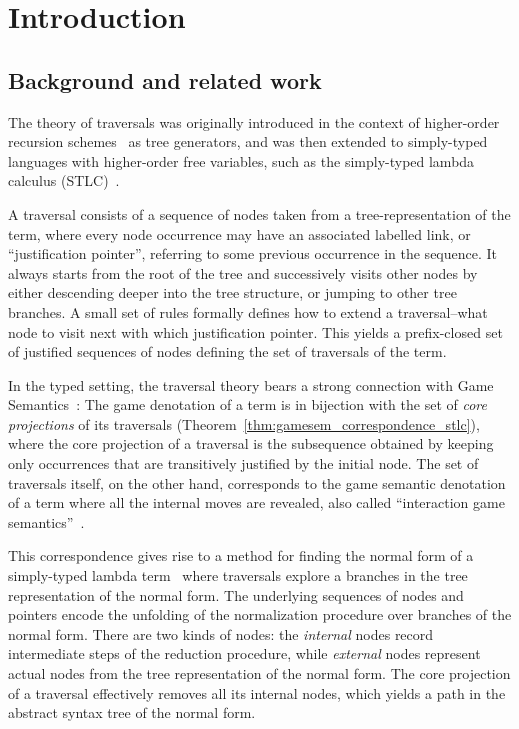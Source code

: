 \documentclass{elsarticle}
\theoremstyle{plain}
\theoremstyle{definition}
\theoremstyle{remark}
\begin{document}
\section{Introduction}

\subsection{Background and related work}

The theory of traversals was originally introduced in the context of higher-order recursion schemes~\cite{OngLics2006} as tree generators, and was
then extended to simply-typed languages with higher-order free variables, such as the simply-typed lambda calculus (STLC)~\cite{BlumPhd}.

A traversal consists of a sequence of nodes taken from a tree-representation of the term, where every node occurrence may have an associated labelled link, or ``justification pointer'', referring to some previous occurrence in the sequence. It always starts from the root of the tree and successively visits other nodes by either descending deeper into the tree structure, or jumping to other tree branches. A small set of rules formally defines how to extend a traversal--what node to visit next with which justification pointer. This yields a prefix-closed set of justified sequences of nodes defining the set of traversals of the term.

In the typed setting, the traversal theory bears a strong connection with Game Semantics~\cite{BlumPhd}: The game denotation of a term is in bijection with the set of \emph{core projections} of its traversals (Theorem~\ref{thm:gamesem_correspondence_stlc}), where the core projection of a traversal is the subsequence obtained by keeping only occurrences that are
transitively justified by the initial node.
The set of traversals itself, on the other hand, corresponds to the game semantic denotation of a term where all the internal moves are revealed, also called ``interaction game semantics''~\cite{BlumPhd}.

This correspondence gives rise to a method for finding the normal form of a simply-typed lambda term~\cite{BlumPhd,BlumGalop2008,Blum-LocalBeta2008}
where traversals explore a branches in the tree representation of the normal form. The underlying sequences of nodes and pointers encode the unfolding of the normalization procedure over branches of the normal form. There are two kinds of nodes: the \emph{internal} nodes record intermediate steps of the reduction procedure, while \emph{external} nodes represent actual nodes from the tree representation of the normal form. The core projection of a traversal effectively removes all its internal nodes, which yields a path in the abstract syntax tree of the normal form.
\end{document}
